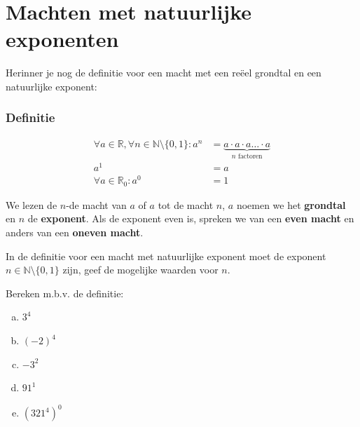 \documentclass[12pt,twoside,a4paper]{article}
\begin{document}
\thispagestyle{empty}
\clearpage

\tableofcontents
\thispagestyle{empty}
\clearpage


\pagestyle{fancy}
\fancyhead[RE,LO]{}

\cleardoublepage
\section{Machten met natuurlijke exponenten}

Herinner je nog de definitie voor een macht met een reëel grondtal en een natuurlijke exponent:

\subsubsection*{Definitie}

\begin{mdframed}
  \vspace*{-1em}
  \begin{align*}
    \forall a \in \mathbb{R}, \forall n\in \mathbb{N}\setminus\{0,1\} : a^n &= \underbrace{a\cdot a \cdot a \ldots \cdot a}_{\mbox{$n$ factoren}}\\
    a^1 &= a\\
    \forall a \in \mathbb{R}_0 : a^0 &= 1
  \end{align*}
\end{mdframed}

We lezen de $n$-de macht van $a$ of $a$ tot de macht $n$, $a$ noemen we het {\bf grondtal} en $n$ de {\bf exponent}. Als de exponent even is, spreken we van een {\bf even macht} en anders van een {\bf oneven macht}.

\begin{oefening}
In de definitie voor een macht met natuurlijke exponent moet de exponent $n\in \mathbb{N}\setminus\{0,1\}$ zijn, geef de mogelijke waarden voor $n$.
\end{oefening}

\begin{oefening}
Bereken m.b.v. de definitie:
\begin{multicols}{2}
\begin{enumerate}[(a)]
  \itemsep1em
  \item $3^4$
  \item $(-2)^4$
  \item $-3^2$
  \item $91^1$
  \item $\left(321^4\right)^0$
\end{enumerate}
\end{multicols}
\end{oefening}
\end{document}
